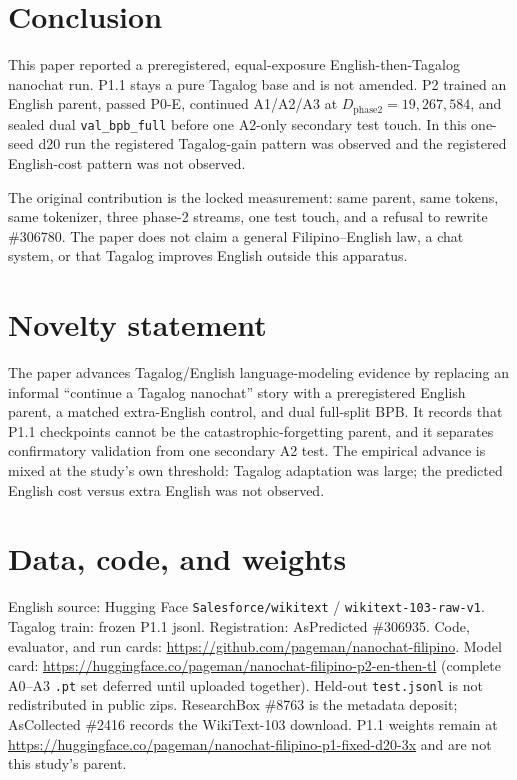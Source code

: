 \documentclass[11pt,a4paper]{article}
\begin{document}
\section{Conclusion}
\label{sec:conclusion}

This paper reported a preregistered, equal-exposure English-then-Tagalog nanochat run. P1.1 stays a pure Tagalog base and is not amended. P2 trained an English parent, passed P0-E, continued A1/A2/A3 at $D_{\mathrm{phase2}}=19{,}267{,}584$, and sealed dual \texttt{val\_bpb\_full} before one A2-only secondary test touch. In this one-seed d20 run the registered Tagalog-gain pattern was observed and the registered English-cost pattern was not observed.

The original contribution is the locked measurement: same parent, same tokens, same tokenizer, three phase-2 streams, one test touch, and a refusal to rewrite \#306780. The paper does not claim a general Filipino--English law, a chat system, or that Tagalog improves English outside this apparatus.

\section*{Novelty statement}
The paper advances Tagalog/English language-modeling evidence by replacing an informal ``continue a Tagalog nanochat'' story with a preregistered English parent, a matched extra-English control, and dual full-split BPB. It records that P1.1 checkpoints cannot be the catastrophic-forgetting parent, and it separates confirmatory validation from one secondary A2 test. The empirical advance is mixed at the study's own threshold: Tagalog adaptation was large; the predicted English cost versus extra English was not observed.

\section*{Data, code, and weights}
English source: Hugging Face \texttt{Salesforce/wikitext} / \texttt{wikitext-103-raw-v1}. Tagalog train: frozen P1.1 jsonl. Registration: AsPredicted \#306935. Code, evaluator, and run cards: \url{https://github.com/pageman/nanochat-filipino}. Model card: \url{https://huggingface.co/pageman/nanochat-filipino-p2-en-then-tl} (complete A0--A3 \texttt{.pt} set deferred until uploaded together). Held-out \texttt{test.jsonl} is not redistributed in public zips. ResearchBox \#8763 is the metadata deposit; AsCollected \#2416 records the WikiText-103 download. P1.1 weights remain at \url{https://huggingface.co/pageman/nanochat-filipino-p1-fixed-d20-3x} and are not this study's parent.
\end{document}
